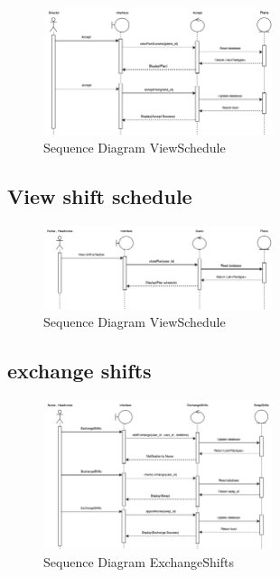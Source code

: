    \begin{figure}
    \centering
    \includegraphics[width=0.6\textwidth]{Sequence 4.4.png}
    \caption{Sequence Diagram ViewSchedule}
    \end{figure}

\subsection{View shift schedule}

    \begin{figure}[h]
    \centering
    \includegraphics[width=0.6\textwidth]{Sequence 5.1.png}
    \caption{Sequence Diagram ViewSchedule}
    \end{figure}

\subsection{exchange shifts}

    \begin{figure}[h]
    \centering
    \includegraphics[width=0.6\textwidth]{Sequence 6.1.png}
    \caption{Sequence Diagram ExchangeShifts}
    \end{figure}
    
